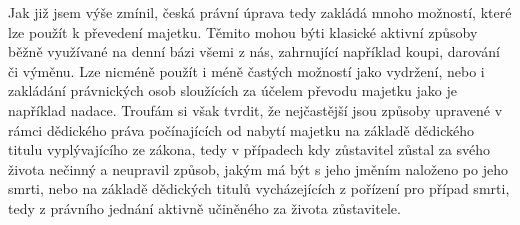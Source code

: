 \documentclass{article}
\begin{document}


Jak již jsem výše zmínil, česká právní úprava tedy zakládá mnoho možností, které lze použít k převedení majetku. Těmito mohou býti klasické aktivní způsoby běžně využívané na denní bázi všemi z nás, zahrnující například koupi, darování či výměnu. Lze nicméně použít i méně častých možností jako vydržení, nebo i zakládání právnických osob sloužících za účelem převodu majetku jako je například nadace. Troufám si však tvrdit, že nejčastější jsou způsoby upravené v rámci dědického práva počínajících od nabytí majetku na základě dědického titulu vyplývajícího ze zákona, tedy v případech kdy zůstavitel zůstal za svého života nečinný a neupravil způsob, jakým má být s jeho jměním naloženo po jeho smrti, nebo na základě dědických titulů vycházejících z pořízení pro případ smrti, tedy z právního jednání aktivně učiněného za života zůstavitele. \\
\end{document}
